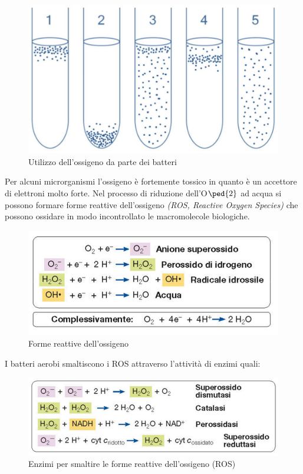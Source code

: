 \documentclass[11pt]{book}
\begin{document}
\begin{figure}[htp]
\centering
\includegraphics[scale=0.4]{img/Utilizzo ossigeno.png}
\caption{Utilizzo dell'ossigeno da parte dei batteri}
\label{}
\end{figure}

Per alcuni microrganismi l’ossigeno è fortemente tossico in quanto è un accettore di elettroni molto forte. Nel processo di riduzione dell'O$\ped{2}$ ad acqua si possono formare forme reattive dell’ossigeno \emph{(ROS, Reactive Oxygen Species)} che possono ossidare in modo incontrollato le macromolecole biologiche.

\clearpage
\begin{figure}[htp]
\centering
\includegraphics[scale=0.4]{img/ROS.png}
\caption{Forme reattive dell'ossigeno}
\label{}
\end{figure}
 
I batteri aerobi smaltiscono i ROS attraverso l’attività di enzimi quali:

\begin{figure}[htp]
\centering
\includegraphics[scale=0.4]{img/Enzimi per smaltire ROS.png}
\caption{Enzimi per smaltire le forme reattive dell'ossigeno (ROS)}
\label{}
\end{figure}
\end{document}
